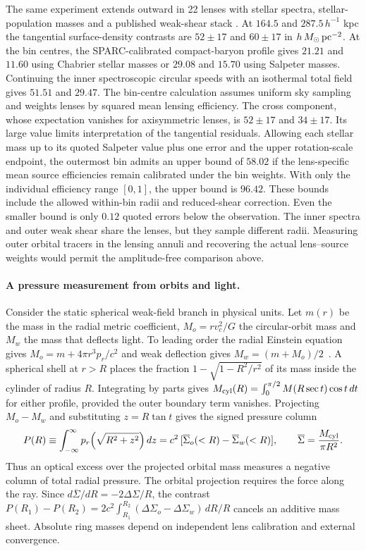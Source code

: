 \documentclass[11pt]{article}
\begin{document}
The same experiment extends outward in 22 lenses with stellar spectra,
stellar-population masses and a published weak-shear stack
\cite{gavazzi2007,auger2009}. At $164.5$ and $287.5\,h^{-1}$ kpc the
tangential surface-density contrasts are $52\pm17$ and $60\pm17$ in
$h\,M_\odot\,{\rm pc}^{-2}$. At the bin centres, the SPARC-calibrated
compact-baryon profile gives $21.21$ and $11.60$ using Chabrier
stellar masses or $29.08$ and $15.70$ using Salpeter masses. Continuing
the inner spectroscopic circular speeds with an isothermal total field
gives $51.51$ and $29.47$. The bin-centre calculation assumes uniform
sky sampling and weights lenses by squared mean lensing efficiency.
The cross component, whose expectation vanishes for axisymmetric lenses,
is $52\pm17$ and $34\pm17$. Its large value limits interpretation of the
tangential residuals. Allowing each stellar mass up to its quoted
Salpeter value plus one error and the upper rotation-scale endpoint,
the outermost bin admits an upper bound of $58.02$ if the lens-specific
mean source efficiencies remain calibrated under the bin weights.
With only the individual efficiency range $[0,1]$, the upper bound
is $96.42$. These bounds include the allowed within-bin radii and
reduced-shear correction. Even the smaller bound is only $0.12$ quoted
errors below the observation. The inner spectra and outer weak shear share the
lenses, but they sample different radii. Measuring outer orbital tracers
in the lensing annuli and recovering the actual lens--source weights would
permit the amplitude-free comparison above.

\paragraph{A pressure measurement from orbits and light.}
Consider the static spherical weak-field branch in physical units.
Let $m(r)$ be the mass in the radial metric coefficient,
$M_o=rv_c^2/G$ the circular-orbit mass and $M_w$ the mass that
deflects light. To leading order the radial Einstein equation gives
$M_o=m+4\pi r^3p_r/c^2$ and weak deflection gives
$M_w=(m+M_o)/2$~\cite{pressureOptics}. A spherical shell at $r>R$
places the fraction $1-\sqrt{1-R^2/r^2}$ of its mass inside the
cylinder of radius $R$. Integrating by parts gives
$M_{\rm cyl}(R)=\int_0^{\pi/2} M(R\sec t)\cos t\,dt$ for either
profile, provided the outer boundary term vanishes. Projecting
$M_o-M_w$ and substituting $z=R\tan t$ gives the signed pressure column
\begin{equation}
 P(R)\equiv\int_{-\infty}^{\infty}p_r\!\left(\sqrt{R^2+z^2}\right)dz
 =c^2\,[\overline\Sigma_o(<R)-\overline\Sigma_w(<R)],
 \qquad \overline\Sigma=\frac{M_{\rm cyl}}{\pi R^2}.
 \label{eq:radial-pressure-column}
\end{equation}
Thus an optical excess over the projected orbital mass measures a
negative column of total radial pressure. The orbital projection
requires the force along the ray. Since
$d\overline\Sigma/dR=-2\Delta\Sigma/R$, the contrast
$P(R_1)-P(R_2)=2c^2\int_{R_1}^{R_2}(\Delta\Sigma_o-\Delta\Sigma_w)\,dR/R$
cancels an additive mass sheet. Absolute ring masses depend on
independent lens calibration and external convergence.
\end{document}
